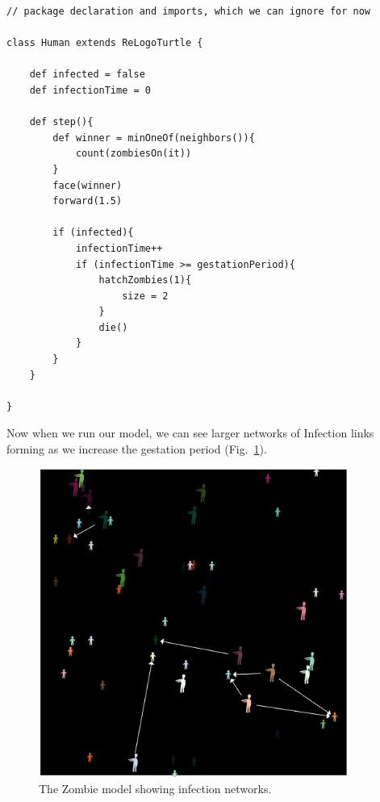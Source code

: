 \documentclass[11pt]{amsart}
\begin{document}
\noindent\begin{minipage}[h]{\textwidth}
\vspace{.2in}
\lstset{language=java,caption=The Human turtle type modified to use a variable gestation period.,label=lst:humantype2}
\begin{lstlisting}
// package declaration and imports, which we can ignore for now

class Human extends ReLogoTurtle {
	
	def infected = false
	def infectionTime = 0
	
	def step(){
		def winner = minOneOf(neighbors()){
			count(zombiesOn(it))
		}
		face(winner)
		forward(1.5)
		
		if (infected){
			infectionTime++
			if (infectionTime >= gestationPeriod){
				hatchZombies(1){
					size = 2
				}
				die()
			}
		}
	}
	
}
\end{lstlisting}
\vspace{.2in}
\end{minipage}

Now when we run our model, we can see larger networks of Infection links forming as we increase the gestation period (Fig.~\ref{fig:infectionnetworks}).

\begin{figure}
\begin{center}
\vspace{.2in}
\centerline {
\includegraphics[width=4in]{GettingStartedImages/ZombieNetworks.png}
}
\caption{The Zombie model showing infection networks.}
\label{fig:infectionnetworks}
\end{center}
\end{figure}
\end{document}
